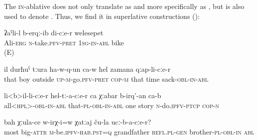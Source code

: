 The \textsc{in}-ablative does not only translate as   and more specifically as  , but is also used to denote  . Thus, we find it in superlative constructions  ():
%
\begin{exe}
	\ex	\label{Ali took away my bike.}
	\gll ʡaˁli-l		b-erqː-ib			di-cːe-r welesepet\\
	Ali-\textsc{erg} \textsc{n}-take.\textsc{pfv-pret} \textsc{1sg-in-abl} bike\\
	\glt	{} (E)
	
	\ex	\label{At this time that boy came out of the sack}
	\gll	il	durħuˁ	tːura	ha-w-q-un ca-w	hel	zamana	qːap-li-cːe-r\\
		that	boy	outside	\textsc{up-m}-go.\textsc{pfv}-\textsc{pret} \textsc{cop-m}	that	time	sack-\textsc{obl-in}-\textsc{abl}\\
	\glt	{}

	\ex	\label{from all, from them (you) need to make one story}
	\gll	li<b>il-li-cːe-r	hel-tː-a-cːe-r	ca	χːabar	b-irq'-an ca-b \\
		all<\textsc{hpl}>-\textsc{obl-in}-\textsc{abl} that-\textsc{pl}-\textsc{obl-in}-\textsc{abl}	one	story	\textsc{n}-do.\textsc{ipfv}-\textsc{ptcp} \textsc{cop-n}\\
	\glt	{}
	
	\ex	\label{Was grandfather the oldest among his brothers}
	\gll	bah	χːula-ce	w-irχ-i=w	χatːaj	ču-la	ucː-b-a-cːe-r? \\
		most	big-\textsc{attr}	\textsc{m}-be.\textsc{ipfv}-\textsc{hab}.\textsc{pst}=\textsc{q} grandfather	\textsc{refl}.\textsc{pl}-\textsc{gen}	brother-\textsc{pl}-\textsc{obl-in} \textsc{abl}\\
	\glt	{}
\end{exe}

